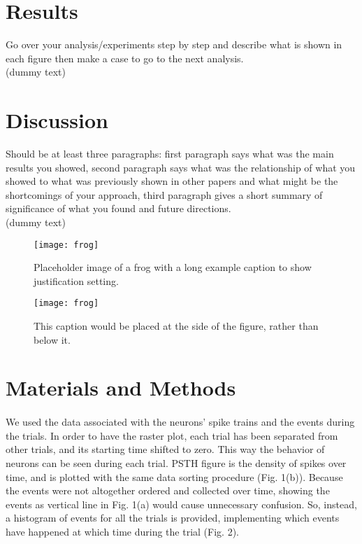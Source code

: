 \documentclass[9pt,twocolumn]{paper-template}
\begin{document}
\section*{Results}
Go over your analysis/experiments step by step and
describe what is shown in each figure then make a case
to go to the next analysis.\\

(dummy text)\lipsum[1]

\section*{Discussion}
Should be at least three paragraphs: first paragraph says what
was the main results you showed, second paragraph says
what was the relationship of what you showed to what
was previously shown in other papers and what might
be the shortcomings of your approach, third paragraph
gives a short summary of significance of what you found
and future directions.\\

(dummy text)\lipsum[1]

\begin{figure}%
\centering
\texttt{[image: frog]}
\caption{Placeholder image of a frog with a long example caption to show justification setting.}
\label{fig:frog}
\end{figure}


\begin{SCfigure*}[\sidecaptionrelwidth][t]
\centering
\texttt{[image: frog]}
\caption{This caption would be placed at the side of the figure, rather than below it.}\label{fig:side}
\end{SCfigure*}

\section*{Materials and Methods}
\paragraph*{} 
We used the data associated with the neurons' spike trains and the events during the trials. In order to have the raster plot, each trial has been separated from other trials, and its starting time shifted to zero. This way the behavior of neurons can be seen during each trial. PSTH figure is the density of spikes over time, and is plotted with the same data sorting procedure (Fig. 1(b)). Because the events were not altogether ordered and collected over time, showing the events as vertical line in Fig. 1(a) would cause unnecessary confusion. So, instead, a histogram of events for all the trials is provided, implementing which events have happened at which time during the trial (Fig. 2).
\end{document}
